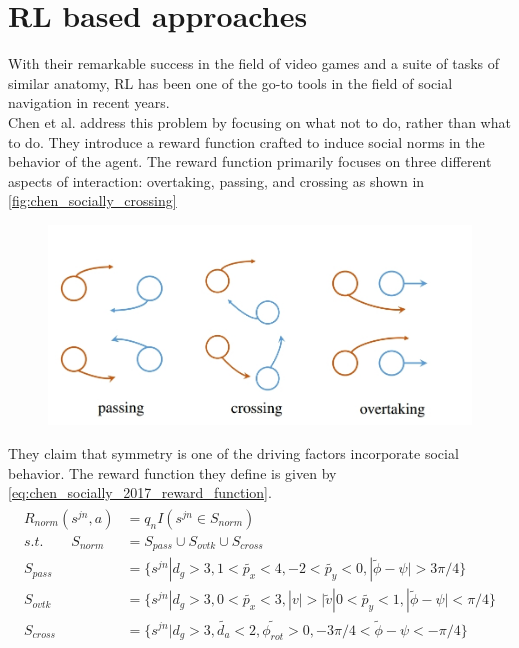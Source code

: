\section{RL based approaches}
 With their remarkable success in the field of video games and a suite of tasks of similar anatomy, RL has been one of the go-to tools in the field of social navigation in recent years. \\
Chen et al. \cite{chen_socially_2017} address this problem by focusing on what not to do, rather than what to do. They introduce a reward function crafted to induce social norms in the behavior of the agent. The reward function primarily focuses on three different aspects of interaction: overtaking, passing, and crossing as shown in \autoref{fig:chen_socially_crossing}
 \begin{figure}[!htbp]
     \centering
    \includegraphics[width=.6\linewidth]{figures/chapter2_rl_based_approach}
    \caption{}
    \label{fig:chen_socially_crossing}
 \end{figure}
They claim that symmetry is one of the driving factors  incorporate social behavior. The reward function they define is given by \autoref{eq:chen_socially_2017_reward_function}.
\begin{align}
\label{eq:chen_socially_2017_reward_function}
\begin{split}
R_{norm}(s^{jn}, a) &=  q_nI(s^{jn} \in S_{norm})\\
s.t. \qquad S_{norm}&=  S_{pass} \cup S_{ovtk} \cup S_{cross}\\
S_{pass} &= \{s^{jn} | d_g > 3, 1 < \tilde{p_x} < 4,
			  -2 < \tilde{p_y} < 0, |\tilde{\phi} - \psi| > 3\pi/4 \} \\
S_{ovtk} &= \{s^{jn} | d_g > 3, 0 < \tilde{p_x} < 3, |v| > |\tilde{v}|
			  0 < \tilde{p_y} < 1, |\tilde{\phi} - \psi| < \pi/4 \} \\
S_{cross} &= \{s^{jn} | d_g > 3, \tilde{d_a} < 2,  \tilde{\phi_{rot}} > 0,
			  -3\pi/4 < \tilde{\phi} - \psi < -\pi/4  \}
\end{split}
\end{align}\\
